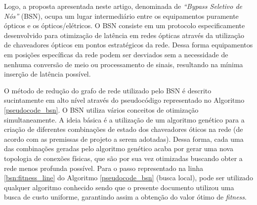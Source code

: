 \documentclass[12pt]{article}
\begin{document}
Logo, a proposta apresentada neste artigo, denominada de \emph{``Bypass Seletivo de Nós''} (BSN), ocupa um lugar intermediário entre os equipamentos puramente ópticos e os ópticos/elétricos. O BSN consiste em um protocolo especificamente desenvolvido para otimização de latência em redes ópticas através da utilização de chaveadores ópticos em pontos estratégicos da rede. Dessa forma equipamentos em posições específicas da rede podem ser desviados sem a necessidade de nenhuma conversão de meio ou processamento de sinais, resultando na mínima inserção de latência possível. 

O método de redução do grafo de rede utilizado pelo BSN é descrito sucintamente em alto nível através do pseudocódigo representado no Algoritmo \ref{pseudocode_bsn}. O BSN utiliza vários conceitos de otimização simultaneamente. A ideia básica é a utilização de um algoritmo genético para a criação de diferentes combinações de estado dos chaveadores óticos na rede (de acordo com as premissas de projeto a serem adotadas). Dessa forma, cada uma das combinações geradas pelo algoritmo genético acaba por gerar uma nova topologia de conexões físicas, que são por sua vez otimizadas buscando obter a rede menos profunda possível. Para o passo representado na linha \ref{bsn:fitness_line} do Algoritmo \ref{pseudocode_bsn} (busca local), pode ser utilizado qualquer algoritmo conhecido sendo que o presente documento utilizou uma busca de custo uniforme, garantindo assim a obtenção do valor ótimo de \emph{fitness}.
\end{document}
